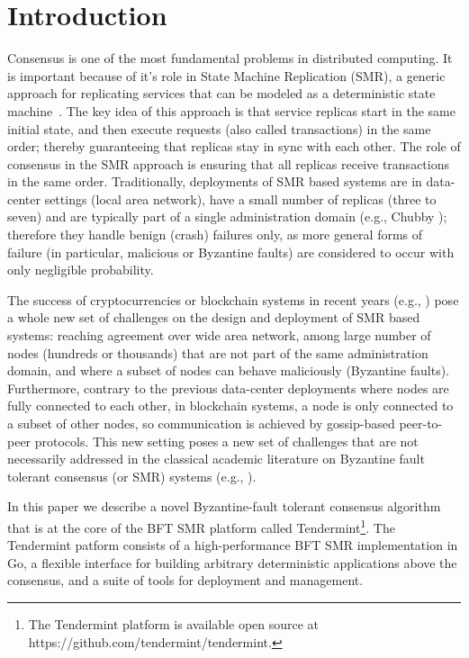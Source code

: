 \section{Introduction} \label{sec:tendermint}

Consensus is one of the most fundamental problems in distributed computing. It
is important because of it's role in State Machine Replication (SMR), a generic
approach for replicating services that can be modeled as a deterministic state
machine~\cite{Lam78:cacm, Sch90:survey}. The key idea of this approach is that
service replicas start in the same initial state, and then execute requests
(also called transactions) in the same order; thereby guaranteeing that
replicas stay in sync with each other. The role of consensus in the SMR
approach is ensuring that all replicas receive transactions in the same order.
Traditionally, deployments of SMR based systems are in data-center settings
(local area network), have a small number of replicas (three to seven) and are
typically part of a single administration domain (e.g., Chubby
\cite{Bur:osdi06}); therefore they handle benign (crash) failures only, as more
general forms of failure (in particular, malicious or Byzantine faults) are
considered to occur with only negligible probability.  

The success of cryptocurrencies or blockchain systems in recent years (e.g.,
\cite{Nak2012:bitcoin, But2014:ethereum}) pose a whole new set of challenges on
the design and deployment of SMR based systems: reaching agreement over wide
area network, among large number of nodes (hundreds or thousands) that are not
part of the same administration domain, and where a subset of nodes can behave
maliciously (Byzantine faults). Furthermore, contrary to the previous
data-center deployments where nodes are fully connected to each other, in
blockchain systems, a node is only connected to a subset of other nodes, so
communication is achieved by gossip-based peer-to-peer protocols. This new
setting poses a new set of challenges that are not necessarily addressed in the
classical academic literature on Byzantine fault tolerant consensus (or SMR)
systems (e.g., \cite{DLS88:jacm, CL02:tcs}).

In this paper we describe a novel Byzantine-fault tolerant consensus algorithm
that is at the core of the BFT SMR platform called Tendermint\footnote{The
Tendermint platform is available open source at
https://github.com/tendermint/tendermint.}. The Tendermint patform consists of
a high-performance BFT SMR implementation in Go, a flexible interface for
building arbitrary deterministic applications above the consensus, and a suite
of tools for deployment and management.  

